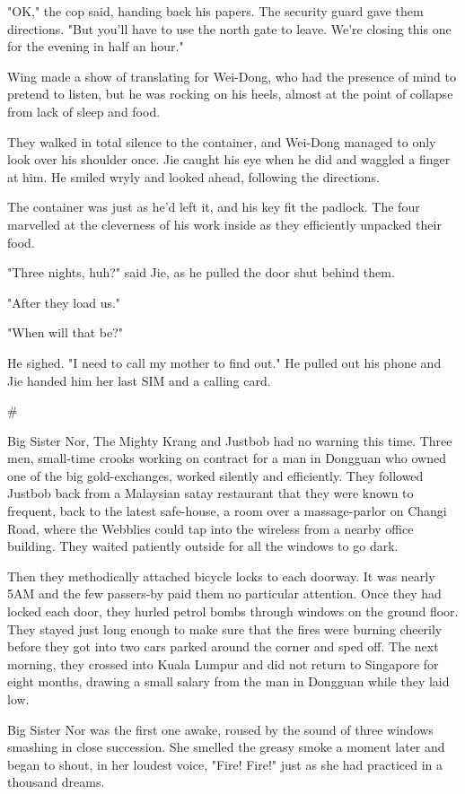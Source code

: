 "OK," the cop said, handing back his papers. The security guard
gave them directions. "But you'll have to use the north gate to
leave. We're closing this one for the evening in half an hour."

Wing made a show of translating for Wei-Dong, who had the presence
of mind to pretend to listen, but he was rocking on his heels,
almost at the point of collapse from lack of sleep and food.

They walked in total silence to the container, and Wei-Dong managed
to only look over his shoulder once. Jie caught his eye when he did
and waggled a finger at him. He smiled wryly and looked ahead,
following the directions.

The container was just as he'd left it, and his key fit the
padlock. The four marvelled at the cleverness of his work inside as
they efficiently unpacked their food.

"Three nights, huh?" said Jie, as he pulled the door shut behind
them.

"After they load us."

"When will that be?"

He sighed. "I need to call my mother to find out." He pulled out
his phone and Jie handed him her last SIM and a calling card.

\#

Big Sister Nor, The Mighty Krang and Justbob had no warning this
time. Three men, small-time crooks working on contract for a man in
Dongguan who owned one of the big gold-exchanges, worked silently
and efficiently. They followed Justbob back from a Malaysian satay
restaurant that they were known to frequent, back to the latest
safe-house, a room over a massage-parlor on Changi Road, where the
Webblies could tap into the wireless from a nearby office building.
They waited patiently outside for all the windows to go dark.

Then they methodically attached bicycle locks to each doorway. It
was nearly 5AM and the few passers-by paid them no particular
attention. Once they had locked each door, they hurled petrol bombs
through windows on the ground floor. They stayed just long enough
to make sure that the fires were burning cheerily before they got
into two cars parked around the corner and sped off. The next
morning, they crossed into Kuala Lumpur and did not return to
Singapore for eight months, drawing a small salary from the man in
Dongguan while they laid low.

Big Sister Nor was the first one awake, roused by the sound of
three windows smashing in close succession. She smelled the greasy
smoke a moment later and began to shout, in her loudest voice,
"Fire! Fire!" just as she had practiced in a thousand dreams.

